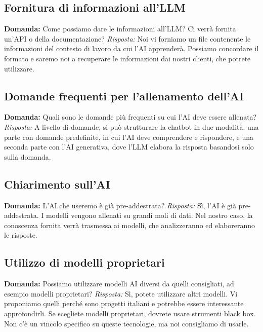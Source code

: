 \documentclass{article}
\begin{document}
\subsection{Fornitura di informazioni all'LLM}
\textbf{Domanda:} Come possiamo dare le informazioni all'LLM? Ci verrà fornita un'API o della documentazione? \newline
\textit{Risposta:} Noi vi forniamo un file contenente le informazioni del contesto di lavoro da cui l'AI apprenderà. Possiamo concordare il formato e saremo noi a recuperare le informazioni dai nostri clienti, che potrete utilizzare.

\subsection{Domande frequenti per l'allenamento dell'AI}
\textbf{Domanda:} Quali sono le domande più frequenti su cui l'AI deve essere allenata? \newline
\textit{Risposta:} A livello di domande, si può strutturare la chatbot in due modalità: una parte con domande predefinite, in cui l'AI deve comprendere e rispondere, e una seconda parte con l'AI generativa, dove l'LLM elabora la risposta basandosi solo sulla domanda.

\subsection{Chiarimento sull'AI}
\textbf{Domanda:} L'AI che useremo è già pre-addestrata? \newline
\textit{Risposta:} Sì, l'AI è già pre-addestrata. I modelli vengono allenati su grandi moli di dati. Nel nostro caso, la conoscenza fornita verrà trasmessa ai modelli, che analizzeranno ed elaboreranno le risposte.

\subsection{Utilizzo di modelli proprietari}
\textbf{Domanda:} Possiamo utilizzare modelli AI diversi da quelli consigliati, ad esempio modelli proprietari? \newline
\textit{Risposta:} Sì, potete utilizzare altri modelli. Vi proponiamo quelli perché sono progetti italiani e potrebbe essere interessante approfondirli. Se scegliete modelli proprietari, dovrete usare strumenti black box. Non c'è un vincolo specifico su queste tecnologie, ma noi consigliamo di usarle.
\end{document}
